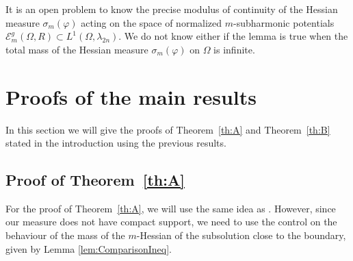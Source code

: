 \documentclass[11pt]{article}
\numberwithin{equation}{section}
\theoremstyle{definition}
\theoremstyle{plain}
\theoremstyle{definition}
\begin{document}
It is an open problem to know the precise modulus of continuity of the Hessian measure $\sigma_m (\varphi)$ acting on the space of normalized $m$-subharmonic potentials $\mathcal{E}^g_m(\Omega,R) \subset L^1 (\Omega,\lambda_{2 n})$. We do not know either if the lemma is true when the total mass of the Hessian measure $\sigma_m (\varphi) $ on $\Omega$ is infinite.

\section{Proofs of the main results}\label{sec:5}

In this section we will give the proofs of Theorem~\ref{th:A} and Theorem~\ref{th:B} stated in the introduction using the previous results.

\subsection{ Proof of Theorem~\ref{th:A}}

For the proof of Theorem~\ref{th:A}, we will use the same idea as \cite{KN19}. However, since our measure does not have compact support, we need to use the control on the behaviour of the mass of the $m$-Hessian of the subsolution close to the boundary, given by Lemma \ref{lem:ComparisonIneq}.
\end{document}
